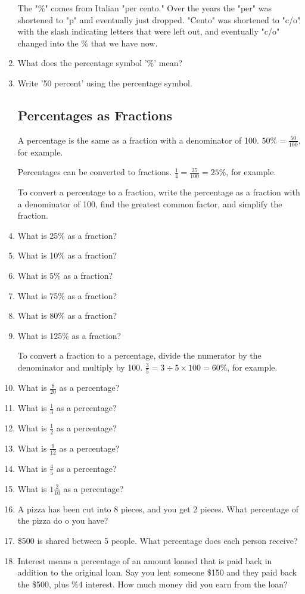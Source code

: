 \documentclass{article}
\begin{document}
\begin{spacing}{1.25}
\begin{enumerate}
The "\%" comes from Italian "per cento." Over the years the "per" was shortened to "p" and eventually just dropped. "Cento" was shortened to "c/o" with the slash indicating letters that were left out, and eventually "c/o" changed into the \% that we have now.

\item What does the percentage symbol '\%' mean?
\item Write '50 percent' using the percentage symbol.

\subsection*{Percentages as Fractions}
A percentage is the same as a fraction with a denominator of 100. $50\% = \frac{50}{100}$, for example.

Percentages can be converted to fractions. $\frac{1}{4}=\frac{25}{100}=25\%$, for example.

To convert a percentage to a fraction, write the percentage as a fraction with a denominator of 100, find the greatest common factor, and simplify the fraction.

\item What is 25\% as a fraction?
\item What is 10\% as a fraction?
\item What is 5\% as a fraction?
\item What is 75\% as a fraction?
\item What is 80\% as a fraction?
\item What is 125\% as a fraction?

To convert a fraction to a percentage, divide the numerator by the denominator and multiply by 100. $\frac{3}{5}=3\div5\times100=60\%$, for example.

\item What is $\frac{8}{20}$ as a percentage?
\item What is $\frac{1}{3}$ as a percentage?
\item What is $\frac{1}{2}$ as a percentage?
\item What is $\frac{9}{12}$ as a percentage?
\item What is $\frac{4}{5}$ as a percentage?
\item What is $1\frac{2}{10}$ as a percentage?

\item A pizza has been cut into 8 pieces, and you get 2 pieces. What percentage of the pizza do o you have?
\item \$500 is shared between 5 people. What percentage does each person receive?
\item Interest means a percentage of an amount loaned that is paid back in addition to the original loan. Say you lent someone \$150 and they paid back the \$500, plus \%4 interest. How much money did you earn from the loan?


\end{enumerate}
\end{spacing}
\end{document}
